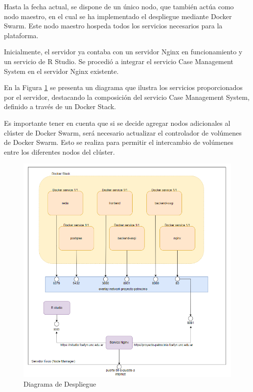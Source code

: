 Hasta la fecha actual, se dispone de un único nodo, que también actúa como nodo maestro, en el cual se ha implementado el despliegue mediante Docker Swarm. Este nodo maestro hospeda todos los servicios necesarios para la plataforma.

Inicialmente, el servidor ya contaba con un servidor Nginx en funcionamiento y un servicio de R Studio. Se procedió a integrar el servicio Case Management System en el servidor Nginx existente.

En la Figura \ref{fig:deploy-in-server} se presenta un diagrama que ilustra los servicios proporcionados por el servidor, destacando la composición del servicio Case Management System, definido a través de un Docker Stack.



Es importante tener en cuenta que si se decide agregar nodos adicionales al clúster de Docker Swarm, será necesario actualizar el controlador de volúmenes de Docker Swarm. Esto se realiza para permitir el intercambio de volúmenes entre los diferentes nodos del clúster.

\begin{figure}[H]
\centering
\includegraphics[width=1\linewidth]{fig/deploy.png}
\caption{Diagrama de Despliegue}
\label{fig:deploy-in-server}
\end{figure}

